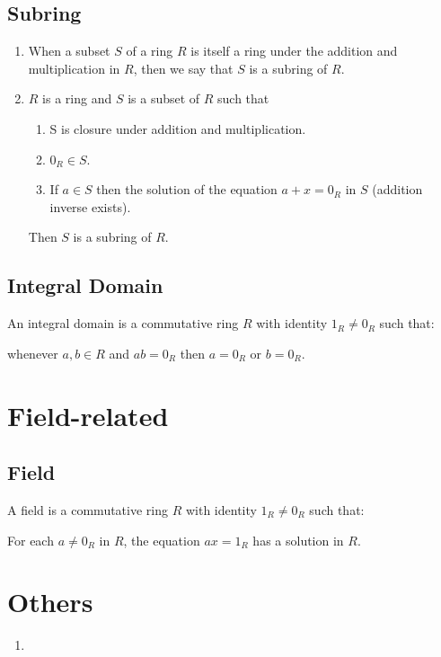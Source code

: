 \documentclass[letter]{article}
\begin{document}
\subsection{Subring}
\begin{enumerate}
	\item When a subset $S$ of a ring $R$ is itself a ring under the addition and multiplication in $R$, then we say that $S$ is a subring of $R$.
	\item $R$ is a ring and $S$ is a subset of $R$ such that
	\begin{enumerate}
		\item S is closure under addition and multiplication.
		\item $0_R\in S$.
		\item If $a\in S$ then the solution of the equation $a+x=0_R$ in $S$ (addition inverse exists).
	\end{enumerate}
	Then $S$ is a subring of $R$.
\end{enumerate}

\subsection{Integral Domain}
An integral domain is a commutative ring $R$ with identity $1_R\neq 0_R$ such that:

whenever $a,b\in R$ and $ab=0_R$ then $a=0_R$ or $b=0_R$.	
\section{Field-related}
\subsection{Field}
A field is a commutative ring $R$ with identity $1_R\neq 0_R$ such that:

For each $a\neq 0_R$ in $R$, the equation $ax=1_R$ has a solution in $R$. 
\section{Others}
\begin{enumerate}
    \item 
\end{enumerate}
\end{document}
